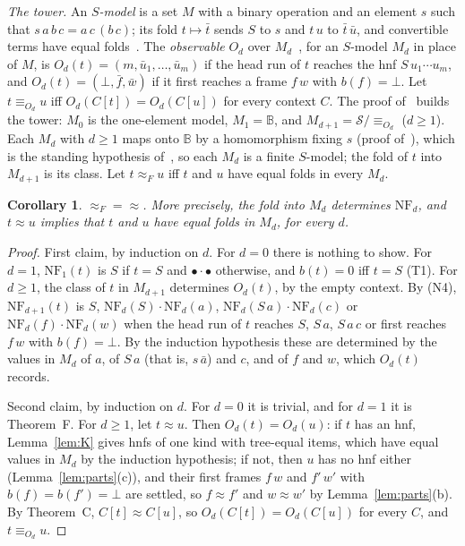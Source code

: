 \documentclass[11pt]{amsart}
\newtheorem{corollary}[theorem]{Corollary}
\theoremstyle{definition}
\newcommand{\Ter}{\mathcal S}
\newcommand{\B}{\mathbb B}
\newcommand{\hole}{\bullet}
\newcommand{\NF}{\mathrm{NF}}
\newcommand{\eqF}{\approx_F}
\begin{document}
\emph{The tower.} An \emph{$S$-model} is a set $M$ with a binary operation and an element $s$ such that
$s\,a\,b\,c=a\,c\,(b\,c)$; its fold $t\mapsto\bar t$ sends $S$ to $s$ and $t\,u$ to $\bar t\,\bar u$, and
convertible terms have equal folds~\citep[\S2]{s6}. The \emph{observable} $O_d$ over $M_d$~\citep[Definition~3]{s6}, for an $S$-model $M_d$ in place of
$M$, is $O_d(t)=(m,\bar u_1,\dots,\bar u_m)$ if the head run of $t$ reaches the hnf $S\,u_1\cdots u_m$, and
$O_d(t)=(\bot,\bar f,\bar w)$ if it first reaches a frame $f\,w$ with $b(f)=\bot$. Let $t\equiv_{O_d} u$ iff
$O_d(C[t])=O_d(C[u])$ for every context $C$. The proof of~\citep[Theorem~1]{s6} builds the tower: $M_0$
is the one-element model, $M_1=\B$, and $M_{d+1}=\Ter/{\equiv_{O_d}}$ ($d\ge1$). Each $M_d$ with $d\ge1$
maps onto $\B$ by a homomorphism fixing $s$ (proof of~\citep[Theorem~1]{s6}), which is the standing
hypothesis of~\citep[Lemma~10]{s6}, so each $M_d$ is a finite $S$-model; the fold of $t$ into
$M_{d+1}$ is its class. Let
$t\eqF u$ iff $t$ and $u$ have equal folds in every $M_d$.

\begin{corollary}\label{cor:F}
${\eqF}={\approx}$. More precisely, the fold into $M_d$ determines $\NF_d$, and $t\approx u$ implies that
$t$ and $u$ have equal folds in $M_d$, for every $d$.
\end{corollary}

\begin{proof}
First claim, by induction on $d$. For $d=0$ there is nothing to show. For $d=1$, $\NF_1(t)$ is $S$ if
$t=S$ and $\hole\cdot\hole$ otherwise, and $b(t)=0$ iff $t=S$ (T1). For $d\ge1$, the class of $t$ in
$M_{d+1}$ determines $O_d(t)$, by the empty context. By (N4), $\NF_{d+1}(t)$ is $S$,
$\NF_d(S)\cdot\NF_d(a)$, $\NF_d(S\,a)\cdot\NF_d(c)$ or $\NF_d(f)\cdot\NF_d(w)$ when the head run of $t$
reaches $S$, $S\,a$, $S\,a\,c$ or first reaches $f\,w$ with $b(f)=\bot$. By the induction hypothesis
these are determined by the values in $M_d$ of $a$, of $S\,a$ (that is, $s\,\bar a$) and $c$, and of $f$
and $w$, which $O_d(t)$ records.

Second claim, by induction on $d$. For $d=0$ it is trivial, and for $d=1$ it is Theorem~F. For
$d\ge1$, let $t\approx u$. Then $O_d(t)=O_d(u)$: if $t$ has an hnf, Lemma~\ref{lem:K} gives hnfs of one kind
with tree-equal items, which have equal values in $M_d$ by the induction hypothesis; if not, then $u$
has no hnf either (Lemma~\ref{lem:parts}(c)), and their first frames $f\,w$ and $f'\,w'$ with $b(f)=b(f')=\bot$
are settled, so $f\approx f'$ and $w\approx w'$ by Lemma~\ref{lem:parts}(b). By Theorem~C,
$C[t]\approx C[u]$, so $O_d(C[t])=O_d(C[u])$ for every $C$, and $t\equiv_{O_d} u$.
\end{proof}
\end{document}
